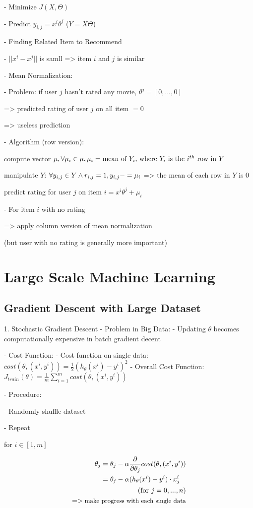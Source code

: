 - Minimize $J(X,\Theta)$ 

- Predict $y_{i,j} = x^i\theta^j$ ($Y = X\Theta$)

- Finding Related Item to Recommend

- $||x^i-x^j||$ is samll => item $i$ and $j$ is similar

- Mean Normalization:

- Problem: if user $j$ hasn't rated any movie, $\theta^j = [0,...,0]$  

=> predicted rating of user $j$ on all item $=0$ 

=> useless prediction

- Algorithm (row version):

	compute vector $\mu, \space \forall \mu_i \in \mu, \mu_i = \text{mean of $Y_i$, where $Y_i$ is the $i^{th}$ row in $Y$}$ 

	manipulate $Y$: $\forall y_{i,j} \in Y \land r_{i,j}=1, \space y_{i,j} -= \mu_i$  => the mean of each row in $Y$ is $0$ 

	predict rating for user $j$ on item $i = x^i\theta^j + \mu_i$ 

- For item $i$ with no rating

=> apply column version of mean normalization

(but user with no rating is generally more important)

\section{Large Scale Machine Learning}

\subsection{Gradient Descent with Large Dataset}

1. Stochastic Gradient Descent
- Problem in Big Data: 
- Updating $\theta$ becomes computationally expensive in batch gradient decent

- Cost Function: 
- Cost function on single data: $cost(\theta, (x^i,y^i)) = \frac 1 2 (h_\theta(x^i)-y^i)^2$ 
- Overall Cost Function: $\displaystyle J_{train}(\theta) = \frac 1 m \sum_{i=1}^m cost(\theta, (x^i,y^i))$

- Procedure:

- Randomly shuffle dataset

- Repeat

	for $i \in [1,m]$ 

		\begin{align}\begin{split} \displaystyle \theta_j &= \theta_j - \alpha \frac {\partial }{\partial \theta_j} cost(\theta,(x^i,y^i)) \\ \displaystyle &= \theta_j - \alpha \space (h_\theta(x^i)-y^i) \cdot  x^i_j \end{split} \\ \text{(for $j=0,...,n$)} \\ \small => \text{make progress with each single data} \end{align}

